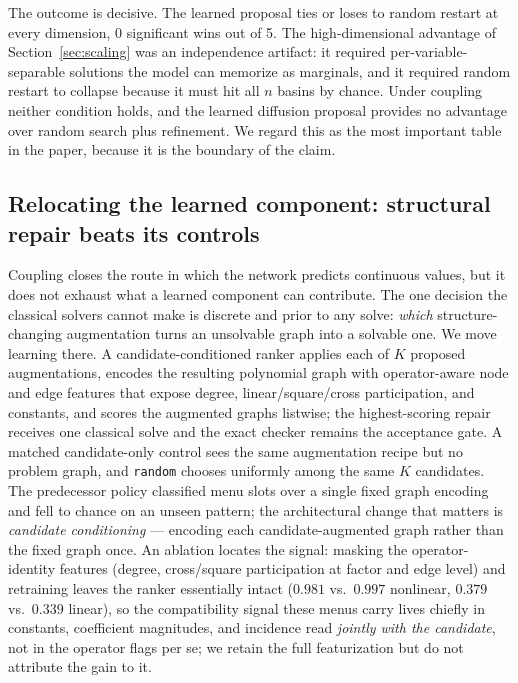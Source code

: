 \documentclass[11pt]{article}
\begin{document}
The outcome is decisive. The learned proposal ties or loses to random restart at every
dimension, 0 significant wins out of 5. The high-dimensional advantage of
Section~\ref{sec:scaling} was an independence artifact: it required per-variable-separable
solutions the model can memorize as marginals, and it required random restart to collapse
because it must hit all $n$ basins by chance. Under coupling neither condition holds, and the
learned diffusion proposal provides no advantage over random search plus refinement. We regard
this as the most important table in the paper, because it is the boundary of the claim.

\subsection{Relocating the learned component: structural repair beats its controls}
\label{sec:repair}

Coupling closes the route in which the network predicts continuous values, but it does not
exhaust what a learned component can contribute. The one decision the classical solvers cannot
make is discrete and prior to any solve: \emph{which} structure-changing augmentation turns an
unsolvable graph into a solvable one. We move learning there. A candidate-conditioned ranker
applies each of $K$ proposed augmentations, encodes the resulting polynomial graph with
operator-aware node and edge features that expose degree, linear/square/cross participation,
and constants, and scores the augmented graphs listwise; the highest-scoring repair receives
one classical solve and the exact checker remains the acceptance gate. A matched candidate-only
control sees the same augmentation recipe but no problem graph, and \texttt{random} chooses
uniformly among the same $K$ candidates. The predecessor policy classified menu slots over a
single fixed graph encoding and fell to chance on an unseen pattern; the architectural change
that matters is \emph{candidate conditioning} --- encoding each candidate-augmented graph rather
than the fixed graph once. An ablation locates the signal: masking the operator-identity
features (degree, cross/square participation at factor and edge level) and retraining leaves
the ranker essentially intact ($0.981$ vs.\ $0.997$ nonlinear, $0.379$ vs.\ $0.339$ linear),
so the compatibility signal these menus carry lives chiefly in constants, coefficient
magnitudes, and incidence read \emph{jointly with the candidate}, not in the operator flags
per se; we retain the full featurization but do not attribute the gain to it.
\end{document}
